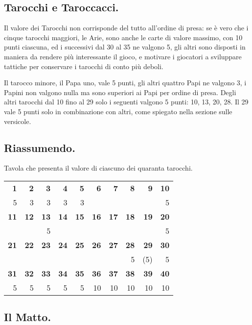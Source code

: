 \documentclass[11pt,a6paper]{article}
\begin{document}
\subsection{Tarocchi e Taroccacci.}

Il valore dei Tarocchi non corrisponde del tutto all'ordine di presa: se è
vero che i cinque tarocchi maggiori, le Arie, sono anche le carte di valore
massimo, con 10 punti ciascuna, ed i successivi dal 30 al 35 ne valgono 5,
gli altri sono disposti in maniera da rendere più interessante il gioco, e
motivare i giocatori a sviluppare tattiche per conservare i tarocchi di
conto più deboli.

Il tarocco minore, il Papa uno, vale 5 punti, gli altri quattro Papi ne
valgono 3, i Papini non valgono nulla ma sono superiori ai Papi per ordine
di presa. Degli altri tarocchi dal 10 fino al 29 solo i seguenti valgono 5
punti: 10, 13, 20, 28.  Il 29 vale 5 punti solo in combinazione con altri,
come spiegato nella sezione sulle versicole.

\subsection{Riassumendo.}

Tavola che presenta il valore di ciascuno dei quaranta tarocchi.

\kern 6pt

{\noindent \scriptsize
  \begin{tabular}{*{10}{|r}|}
\bf  1& \bf 2& \bf 3& \bf 4& \bf 5& \bf 6&\bf  7&\bf  8&\bf  9& \bf 10\\
  5& 3& 3& 3& 3&  &  &  &  & 5\\
\bf 11&\bf 12&\bf 13&\bf 14&\bf 15&\bf 16&\bf 17&\bf 18&\bf 19&\bf 20\\
   &  & 5&  &  &  &  &  &  & 5\\
\bf 21&\bf 22&\bf 23&\bf 24&\bf 25&\bf 26&\bf 27&\bf 28&\bf 29&\bf 30\\
   &  &  &  &  &  &  & 5& (5)& 5\\
\bf 31&\bf 32&\bf 33&\bf 34&\bf 35&\bf 36&\bf 37&\bf 38&\bf 39&\bf 40\\
     5&     5&     5&     5&     5&    10&    10&    10&    10&    10\\
  \end{tabular}
}


\subsection{Il Matto.}
\end{document}
